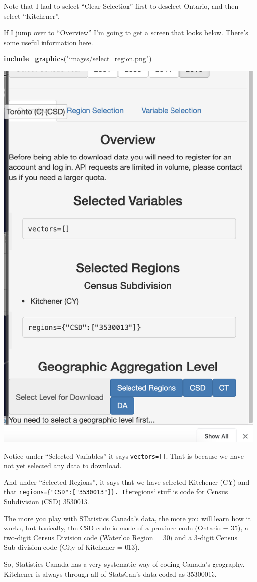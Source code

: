 \documentclass[
]{article}
\newenvironment{Shaded}{\begin{snugshade}}{\end{snugshade}}
\newcommand{\KeywordTok}[1]{\textcolor[rgb]{0.13,0.29,0.53}{\textbf{#1}}}
\newcommand{\NormalTok}[1]{#1}
\newcommand{\StringTok}[1]{\textcolor[rgb]{0.31,0.60,0.02}{#1}}
\begin{document}
Note that I had to select ``Clear Selection'' first to deselect Ontario,
and then select ``Kitchener''.

If I jump over to ``Overview'' I'm going to get a screen that looks
below. There's some useful information here.

\begin{Shaded}
\begin{Highlighting}[]
\KeywordTok{include\_graphics}\NormalTok{(}\StringTok{"images/select\_region.png"}\NormalTok{)}
\end{Highlighting}
\end{Shaded}

\begin{center}\includegraphics[width=0.5\linewidth]{images/select_region} \end{center}

Notice under ``Selected Variables'' it says \texttt{vectors={[}{]}}.
That is because we have not yet selected any data to download.

And under ``Selected Regions'', it says that we have selected Kitchener
(CY) and that \texttt{regions=\{"CSD":{[}"3530013"{]}\}.\ The}regions`
stuff is code for Census Subdivision (CSD) 3530013.

The more you play with STatistics Canada's data, the more you will learn
how it works, but basically, the CSD code is made of a province code
(Ontario = 35), a two-digit Census Division code (Waterloo Region = 30)
and a 3-digit Census Sub-division code (City of Kitchener = 013).

So, Statistics Canada has a very systematic way of coding Canada's
geography. Kitchener is always through all of StatsCan's data coded as
35300013.
\end{document}
